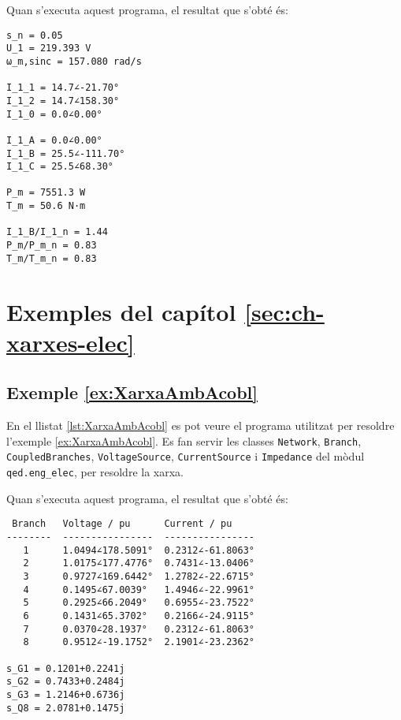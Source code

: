 Quan s'executa aquest programa, el resultat que s'obté és:
\lstset{
	language=,
	numbers=none,
	frame=none
}
\begin{lstlisting}
s_n = 0.05
U_1 = 219.393 V
ω_m,sinc = 157.080 rad/s

I_1_1 = 14.7∠-21.70°
I_1_2 = 14.7∠158.30°
I_1_0 = 0.0∠0.00°

I_1_A = 0.0∠0.00°
I_1_B = 25.5∠-111.70°
I_1_C = 25.5∠68.30°

P_m = 7551.3 W
T_m = 50.6 N·m

I_1_B/I_1_n = 1.44
P_m/P_m_n = 0.83
T_m/T_m_n = 0.83	
\end{lstlisting} 



\section{Exemples del capítol \ref*{sec:ch-xarxes-elec}}

\hypertarget{exemple:XarxaAmbAcobl}{\subsection{Exemple \ref*{ex:XarxaAmbAcobl} \XarxaAmbAcobl}}
En el llistat \vref{lst:XarxaAmbAcobl} es pot veure el programa utilitzat per resoldre l'exemple \vref{ex:XarxaAmbAcobl}. Es fan servir les classes \texttt{Network},  \texttt{Branch}, \texttt{CoupledBranches}, \texttt{VoltageSource}, \texttt{CurrentSource} i \texttt{Impedance} del mòdul \texttt{qed.eng\_elec},  per resoldre la xarxa.

\break



Quan s'executa aquest programa, el resultat que s'obté és:
\lstset{
	language=,
	numbers=none,
	frame=none
}
\begin{lstlisting}
 Branch   Voltage / pu      Current / pu
--------  ----------------  ----------------
   1      1.0494∠178.5091°  0.2312∠-61.8063°
   2      1.0175∠177.4776°  0.7431∠-13.0406°
   3      0.9727∠169.6442°  1.2782∠-22.6715°
   4      0.1495∠67.0039°   1.4946∠-22.9961°
   5      0.2925∠66.2049°   0.6955∠-23.7522°
   6      0.1431∠65.3702°   0.2166∠-24.9115°
   7      0.0370∠28.1937°   0.2312∠-61.8063°
   8      0.9512∠-19.1752°  2.1901∠-23.2362°

s_G1 = 0.1201+0.2241j
s_G2 = 0.7433+0.2484j
s_G3 = 1.2146+0.6736j
s_Q8 = 2.0781+0.1475j
\end{lstlisting} 


